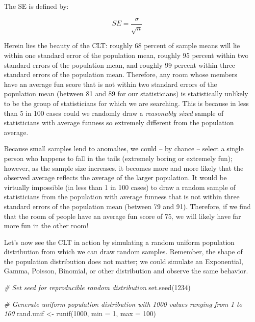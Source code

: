 \documentclass[
]{book}
\newenvironment{Shaded}{\begin{snugshade}}{\end{snugshade}}
\newcommand{\AttributeTok}[1]{\textcolor[rgb]{0.77,0.63,0.00}{#1}}
\newcommand{\CommentTok}[1]{\textcolor[rgb]{0.56,0.35,0.01}{\textit{#1}}}
\newcommand{\DecValTok}[1]{\textcolor[rgb]{0.00,0.00,0.81}{#1}}
\newcommand{\FunctionTok}[1]{\textcolor[rgb]{0.00,0.00,0.00}{#1}}
\newcommand{\NormalTok}[1]{#1}
\newcommand{\OtherTok}[1]{\textcolor[rgb]{0.56,0.35,0.01}{#1}}
\begin{document}
The SE is defined by:

\[ SE = \frac{\sigma}{\sqrt{n}} \]

Herein lies the beauty of the CLT: roughly 68 percent of sample means will lie within one standard error of the population mean, roughly 95 percent within two standard errors of the population mean, and roughly 99 percent within three standard errors of the population mean. Therefore, any room whose members have an average fun score that is not within two standard errors of the population mean (between 81 and 89 for our statisticians) is statistically unlikely to be the group of statisticians for which we are searching. This is because in less than 5 in 100 cases could we randomly draw a \emph{reasonably sized} sample of statisticians with average funness so extremely different from the population average.

Because small samples lend to anomalies, we could -- by chance -- select a single person who happens to fall in the tails (extremely boring or extremely fun); however, as the sample size increases, it becomes more and more likely that the observed average reflects the average of the larger population. It would be virtually impossible (in less than 1 in 100 cases) to draw a random sample of statisticians from the population with average funness that is not within three standard errors of the population mean (between 79 and 91). Therefore, if we find that the room of people have an average fun score of 75, we will likely have far more fun in the other room!

Let's now see the CLT in action by simulating a random uniform population distribution from which we can draw random samples. Remember, the shape of the population distribution does not matter; we could simulate an Exponential, Gamma, Poisson, Binomial, or other distribution and observe the same behavior.

\begin{Shaded}
\begin{Highlighting}[]
\CommentTok{\# Set seed for reproducible random distribution}
\FunctionTok{set.seed}\NormalTok{(}\DecValTok{1234}\NormalTok{)}

\CommentTok{\# Generate uniform population distribution with 1000 values ranging from 1 to 100}
\NormalTok{rand.unif }\OtherTok{\textless{}{-}} \FunctionTok{runif}\NormalTok{(}\DecValTok{1000}\NormalTok{, }\AttributeTok{min =} \DecValTok{1}\NormalTok{, }\AttributeTok{max =} \DecValTok{100}\NormalTok{)}
\end{Highlighting}
\end{Shaded}
\end{document}
